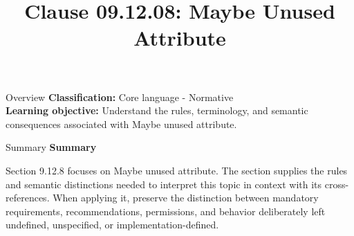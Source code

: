 \documentclass[10pt,letterpaper]{article}
\title{Clause 09.12.08: Maybe Unused Attribute}
\author{}
\date{}
\begin{document}
\maketitle
\begin{CornellOverviewBox}{Overview}
\textbf{Classification:} Core language - Normative\\[2pt]
\textbf{Learning objective:} Understand the rules, terminology, and semantic consequences associated with Maybe unused attribute.
\end{CornellOverviewBox}\begin{CornellSummaryBox}{Summary}
{\sffamily\bfseries\color{Accent} Summary}\par\vspace{3pt}Section 9.12.8 focuses on Maybe unused attribute. The section supplies the rules and semantic distinctions needed to interpret this topic in context with its cross-references. When applying it, preserve the distinction between mandatory requirements, recommendations, permissions, and behavior deliberately left undefined, unspecified, or implementation-defined.
\end{CornellSummaryBox}
\end{document}
